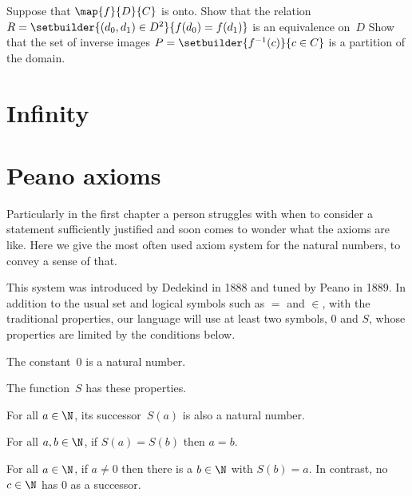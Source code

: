 \documentclass{ibl}
\begin{document}
\begin{ex}
Suppose that $\map{f}{D}{C}$ is onto.
Show that the relation
$R=\setbuilder{(d_0,d_1)\in D^2}{f(d_0)=f(d_1)}$ 
is an equivalence on~$D$ 
Show that the set of inverse images 
$P=\setbuilder{f^{-1}(c)}{c\in C}$ is a partition of the domain.
\end{ex}





\chapter{Infinity}





\appendix
\chapter{Peano axioms}
\newcommand{\axiom}[1]{\textsc{Axiom~#1}\hspace{.5ex}}

Particularly in the 
first chapter a person struggles with when to consider a 
statement sufficiently justified 
and soon comes to wonder what the axioms are like.
Here we give the most often used axiom system for the natural numbers, to
convey a sense of that. 

This system was 
introduced by Dedekind in 1888 and tuned by Peano in 1889.
In addition to the usual set and logical symbols such as $=$ and $\in$,
with the traditional properties, 
our language will use at least two symbols, $0$ and $S$, whose 
properties are limited by the conditions below.

\begin{ax}
The constant~$0$ is a natural number.
\end{ax}

\begin{ax}
The  function~$S$ has these properties.
\begin{exes}
\item {} For all $a\in\N$, its successor~$S(a)$ is also 
  a natural number.
\item {} For all $a,b\in\N$, if $S(a)=S(b)$ then $a=b$.
\item {}
  For all $a\in\N$, if $a\neq 0$ then there is a $b\in\N$ with $S(b)=a$.
  In contrast, no $c\in\N$ has $0$ as a successor.  
\end{exes}
\end{ax}
\end{document}
